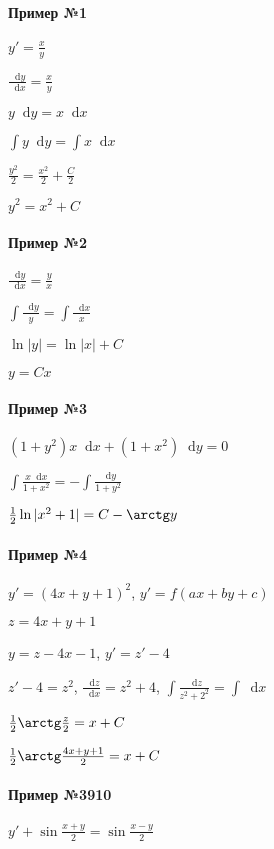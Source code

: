 \documentclass{article}
\newcommand*\diff{\mathop{}\!\mathrm{d}}
\begin{document}
\begin{minipage}{0.49\textwidth}
    \paragraph{Пример №1} $y' = \frac{x}{y}$

    $\frac{\diff y}{\diff x} = \frac{x}{y}$
    
    $y \diff y = x \diff x$
    
    $\int y \diff y = \int x \diff x$
    
    $\frac{y^2}{2} = \frac{x^2}{2} + \frac{C}{2}$
    
    $y^2 = x^2 + C$
    
    \paragraph{Пример №2} $\frac{\diff y}{\diff x} = \frac{y}{x}$
    
    $\int \frac{\diff y}{y} = \int \frac{\diff x}{x}$
    
    $\ln |y| = \ln |x| + C$
    
    $y = C x$
    
    \paragraph{Пример №3} $(1 + y^2) x \diff x + (1 + x^2) \diff y = 0$
    
    $\int \frac{x \diff x}{1 + x^2} = - \int \frac{\diff y}{1 + y^2}$
    
    $\frac{1}{2} \ln |x^2 + 1| = C - \arctg y$
    
    \paragraph{Пример №4} $y' = (4x + y + 1)^2$, $y' = f(ax + by + c)$
    
    $z = 4x + y + 1$
    
    $y = z - 4x - 1$, $y' = z' - 4$
    
    $z' - 4 = z^2$, $\frac{\diff z}{\diff x} = z^2 + 4$, $\int \frac{\diff z}{z^2 + 2^2} = \int \diff x$
    
    $\frac{1}{2} \arctg \frac{z}{2} = x + C$
    
    $\frac{1}{2} \arctg \frac{4x + y + 1}{2} = x + C$

    \paragraph{Пример №3910}
    $y' + \sin \frac{x + y}{2} = \sin \frac{x - y}{2}$


\end{minipage}
\end{document}
